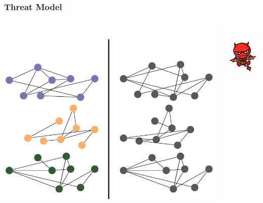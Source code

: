 \documentclass[hyperref={colorlinks = true},unknownkeysallowed]{beamer}
\begin{document}
\begin{frame}
	\frametitle{Threat Model}
	\begin{columns}
		\begin{column}{0.6\textwidth}
			\includegraphics[scale=0.5]{figs/network_setting.png}
		\end{column}
		\begin{column}{0.4\textwidth}
			\hspace{1cm}
			\includegraphics[width=3cm, height=3cm]{figs/adv1.png}
		\end{column}	
	\end{columns}
\end{frame}
\end{document}
